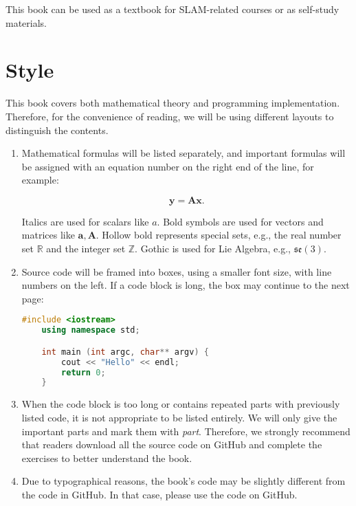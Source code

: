 This book can be used as a textbook for SLAM-related courses or as self-study materials.

\section*{Style}

This book covers both mathematical theory and programming implementation. Therefore, for the convenience of reading, we will be using different layouts to distinguish the contents.

\begin{enumerate}
	\item Mathematical formulas will be listed separately, and important formulas will be assigned with an equation number on the right end of the line, for example:

	\begin{equation}
	\mathbf{y} =\mathbf{A}\mathbf{x}.
	\end{equation}

	Italics are used for scalars like $a$. Bold symbols are used for vectors and matrices like $\mathbf{a}, \mathbf{A}$. Hollow bold represents special sets, e.g., the real number set $\mathbb{R}$ and the integer set $\mathbb{Z}$. Gothic is used for Lie Algebra, e.g., $\mathfrak{se}(3)$.

	\item Source code will be framed into boxes, using a smaller font size, with line numbers on the left. If a code block is long, the box may continue to the next page:
	\begin{lstlisting}[language=C++,caption=Code example:]
	#include <iostream>
	using namespace std;

	int main (int argc, char** argv) {
		cout << "Hello" << endl;
		return 0;
	}
	\end{lstlisting}

	\item When the code block is too long or contains repeated parts with previously listed code, it is not appropriate to be listed entirely. We will only give the important parts and mark them with \textit{part}. Therefore, we strongly recommend that readers download all the source code on GitHub and complete the exercises to better understand the book.

	\item Due to typographical reasons, the book's code may be slightly different from the code in GitHub. In that case, please use the code on GitHub.


\end{enumerate}
